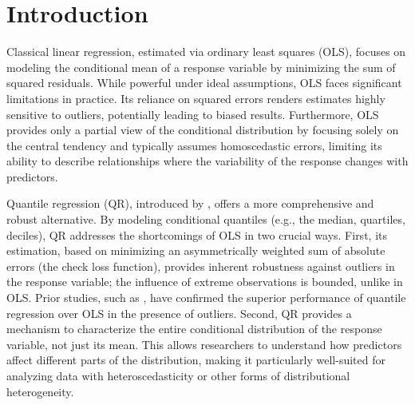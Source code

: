 \documentclass[fleqn,10pt]{latex/stylish_article} %
\affiliation{

}
\affiliation{*\textbf{Contact}: \href{mailto:100538493@alumnos.uc3m.es}{\nolinkurl{100538493@alumnos.uc3m.es}} and \href{mailto:100508278@alumnos.uc3m.es}{\nolinkurl{100508278@alumnos.uc3m.es}}, www.uc3m.es} %
\begin{document}

\flushbottom %

\maketitle %

\tableofcontents %

\thispagestyle{empty} %


\section{Introduction}\label{introduction}

Classical linear regression, estimated via ordinary least squares (OLS), focuses on modeling the conditional mean of a response variable by minimizing the sum of squared residuals. While powerful under ideal assumptions, OLS faces significant limitations in practice. Its reliance on squared errors renders estimates highly sensitive to outliers, potentially leading to biased results. Furthermore, OLS provides only a partial view of the conditional distribution by focusing solely on the central tendency and typically assumes homoscedastic errors, limiting its ability to describe relationships where the variability of the response changes with predictors.

Quantile regression (QR), introduced by \citet{Koenker1978}, offers a more comprehensive and robust alternative. By modeling conditional quantiles (e.g., the median, quartiles, deciles), QR addresses the shortcomings of OLS in two crucial ways. First, its estimation, based on minimizing an asymmetrically weighted sum of absolute errors (the check loss function), provides inherent robustness against outliers in the response variable; the influence of extreme observations is bounded, unlike in OLS. Prior studies, such as \citet{Onyedikachi2015}, have confirmed the superior performance of quantile regression over OLS in the presence of outliers. Second, QR provides a mechanism to characterize the entire conditional distribution of the response variable, not just its mean. This allows researchers to understand how predictors affect different parts of the distribution, making it particularly well-suited for analyzing data with heteroscedasticity or other forms of distributional heterogeneity.
\end{document}
